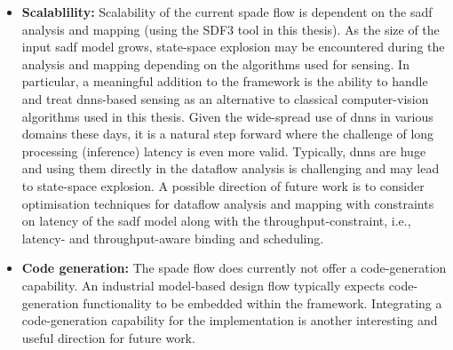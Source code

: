 \begin{itemize}
    \item \textbf{Scalablility:} Scalability of the current \gls{spade} flow is dependent on the \gls{sadf} analysis and mapping (using the SDF3 tool in this thesis). As the size of the input \gls{sadf} model grows, state-space explosion may be encountered during the analysis and mapping depending on the algorithms used for sensing. In particular, a meaningful addition to the framework is the ability to handle and treat \glspl{dnn}-based sensing as an alternative to classical computer-vision algorithms used in this thesis. Given the wide-spread use of \glspl{dnn} in various domains these days, it is a natural step forward where the challenge of long processing (inference) latency is even more valid. Typically, \glspl{dnn} are huge and using them directly in the dataflow analysis is challenging and may lead to state-space explosion. A possible direction of future work is to consider optimisation techniques for dataflow analysis and mapping with constraints on latency of the \gls{sadf} model along with the throughput-constraint, i.e., latency- and throughput-aware binding and scheduling. 
    \item \textbf{Code generation:} The \gls{spade} flow does currently not offer a code-generation capability. An industrial model-based design flow typically expects code-generation functionality to be embedded within the framework. Integrating a code-generation capability for the implementation is another interesting and useful direction for future work.
\end{itemize}

